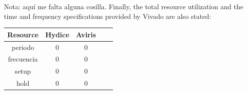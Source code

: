Nota: aquí me falta alguna cosilla.
Finally, the total resource utilization and the time and frequency specifications provided by Vivado are also stated:
\begin{center}
 \begin{tabular}{|c|c|c|c|c|} 
 \hline
 Resource & Hydice & Aviris\\ [0.5ex] 
 \hline\hline
 periodo & 0 & 0\\ 
 \hline
 frecuencia & 0 & 0\\ 
 \hline
 setup & 0 & 0\\ 
 \hline
 hold & 0 & 0\\ 
 \hline
\end{tabular}
\end{center}